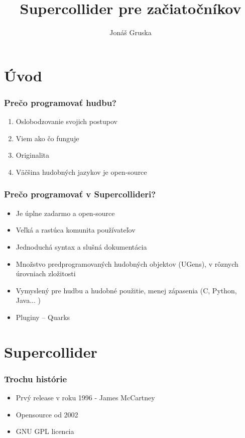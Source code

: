 \documentclass{beamer}
\title{Supercollider pre začiatočníkov}
\author{Jonáš Gruska}
\institute[Royal Conservatory] %
{
		Institute of Sonology\\
		Den Haag, Netherlands
	}
\date{}
\begin{document}
\begin{frame}
\titlepage
\end{frame}

\section{Úvod}

\begin{frame}
\frametitle{Prečo programovať hudbu?}
	\begin{enumerate}
		\item Oslobodzovanie svojich postupov
		\item Viem ako čo funguje
		\item Originalita
		\item Väčšina hudobných jazykov je open-source
	\end{enumerate}
\end{frame}

\begin{frame}
\frametitle{Prečo programovať v Supercollideri?}
	\begin{itemize}
		\item Je úplne zadarmo a open-source
		\item Veľká a rastúca komunita používateľov
		\item Jednoduchá syntax a slušná dokumentácia
		\item Množstvo predprogramovaných hudobných objektov (UGens), v rôznych úrovniach zložitosti
		\item Vymyslený pre hudbu a hudobné použitie, menej zápasenia (C, Python, Java... )
		\item Pluginy -- Quarks 
	\end{itemize}
\end{frame}

\section{Supercollider}
\begin{frame}
	\frametitle{Trochu histórie}
	\begin{itemize}
		\item Prvý release v roku 1996 - James McCartney
		\item Opensource od 2002
		\item GNU GPL licencia
	\end{itemize}
\end{frame}
\end{document}
